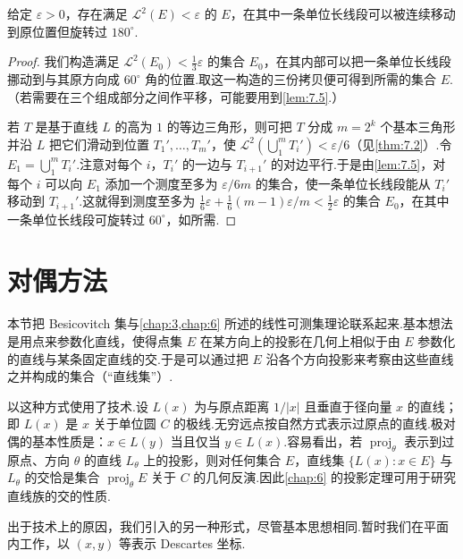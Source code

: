 \begin{theorem}\label{thm:7.6}
给定 $\varepsilon>0$，存在满足 $\mathscr{L}^2(E)<\varepsilon$ 的 $E$，在其中一条单位长线段可以被连续移动到原位置但旋转过 $180^{\circ}$.
\end{theorem}

\begin{proof}
我们构造满足 $\mathscr{L}^2(E_0)<\frac{1}{3}\varepsilon$ 的集合 $E_0$，在其内部可以把一条单位长线段挪动到与其原方向成 $60^{\circ}$ 角的位置.取这一构造的三份拷贝便可得到所需的集合 $E$.（若需要在三个组成部分之间作平移，可能要用到\cref{lem:7.5}.）

若 $T$ 是基于直线 $L$ 的高为 $1$ 的等边三角形，则可把 $T$ 分成 $m=2^k$ 个基本三角形并沿 $L$ 把它们滑动到位置 $T_1',\ldots,T_m'$，使 $\mathscr{L}^2(\bigcup_1^m T_i')<\varepsilon/6$（见\cref{thm:7.2}）.令 $E_1=\bigcup_1^m T_i'$.注意对每个 $i$，$T_i'$ 的一边与 $T_{i+1}'$ 的对边平行.于是由\cref{lem:7.5}，对每个 $i$ 可以向 $E_1$ 添加一个测度至多为 $\varepsilon/6m$ 的集合，使一条单位长线段能从 $T_i'$ 移动到 $T_{i+1}'$.这就得到测度至多为 $\frac{1}{6}\varepsilon+\frac{1}{6}(m-1)\varepsilon/m<\frac{1}{2}\varepsilon$ 的集合 $E_0$，在其中一条单位长线段可旋转过 $60^{\circ}$，如所需.
\end{proof}

\section{对偶方法}

本节把 Besicovitch 集与\cref{chap:3,chap:6} 所述的线性可测集理论联系起来.基本想法是用点来参数化直线，使得点集 $E$ 在某方向上的投影在几何上相似于由 $E$ 参数化的直线与某条固定直线的交.于是可以通过把 $E$ 沿各个方向投影来考察由这些直线之并构成的集合（``直线集''）.

\textcite{besicovitch1964a} 以这种方式使用了技术.设 $L(x)$ 为与原点距离 $1/|x|$ 且垂直于径向量 $x$ 的直线；即 $L(x)$ 是 $x$ 关于单位圆 $C$ 的极线.无穷远点按自然方式表示过原点的直线.极对偶的基本性质是：$x\in L(y)$ 当且仅当 $y\in L(x)$.容易看出，若 $\operatorname{proj}_{\theta}$ 表示到过原点、方向 $\theta$ 的直线 $L_\theta$ 上的投影，则对任何集合 $E$，直线集 $\{L(x):x\in E\}$ 与 $L_\theta$ 的交恰是集合 $\operatorname{proj}_{\theta}E$ 关于 $C$ 的几何反演.因此\cref{chap:6} 的投影定理可用于研究直线族的交的性质.

出于技术上的原因，我们引入的另一种形式，尽管基本思想相同.暂时我们在平面内工作，以 $(x,y)$ 等表示 Descartes 坐标.

